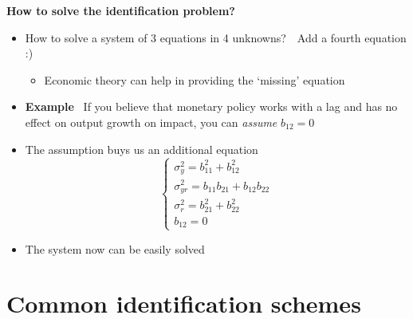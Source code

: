 \begin{frame}
{\textbf{How to solve the identification problem?\medskip }}

\begin{itemize}
\item How to solve a system of 3 equations in 4 unknowns?\pause \ \ Add a
fourth equation :)\smallskip\pause

\begin{itemize}
\item Economic theory can help in providing the `missing' equation\bigskip
\end{itemize}

\pause

\item \textbf{Example} \ If you believe that monetary policy works with a
lag and has no effect on output growth on impact, you can \emph{assume} $%
b_{12}=0$\bigskip

\item The assumption buys us an additional equation%
\begin{equation*}
\left\{ 
\begin{array}{l}
\sigma _{y}^{2}=b_{11}^{2}+b_{12}^{2} \\ 
\sigma _{yr}^{2}=b_{11}b_{21}+b_{12}b_{22} \\ 
\sigma _{r}^{2}=b_{21}^{2}+b_{22}^{2} \\ 
b_{12}=0%
\end{array}%
\right.
\end{equation*}
\pause

\item The system now can be easily solved
\end{itemize}
\end{frame}


\section{Common identification schemes}

\begin{frame}
\vspace{3cm}\color{title} 
\end{frame}


